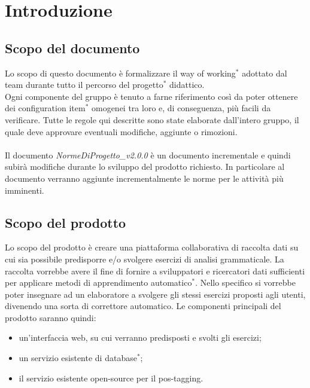 \documentclass[11pt,a4paper]{article}
\begin{document}
{	\newpage	
	
	\renewcommand  \contentsname {\Large Indice} 
	
	\tableofcontents
	\newpage
	\listoffigures
	\lstlistoflistings
	\newpage
	
	\section{Introduzione}
	\subsection{Scopo del documento}
	Lo scopo di questo documento è formalizzare il way of working$^*$ adottato dal team durante tutto il percorso del progetto$^*$ didattico. 
	\\Ogni componente del gruppo è tenuto a farne riferimento così da poter ottenere dei configuration item$^*$ omogenei tra loro e, di conseguenza, più facili da verificare. 
	Tutte le regole qui descritte sono state elaborate dall'intero gruppo, il quale deve approvare eventuali modifiche, aggiunte o rimozioni.
	\\\\
	Il documento \textit{NormeDiProgetto\_v2.0.0} è un documento incrementale e quindi subirà modifiche durante lo sviluppo del prodotto richiesto. In particolare al documento verranno aggiunte incrementalmente le norme per le attività più imminenti.
	\subsection{Scopo del prodotto}
	Lo scopo del prodotto è creare una piattaforma collaborativa di raccolta dati su cui sia possibile predisporre e/o svolgere esercizi di analisi grammaticale. La raccolta vorrebbe avere il fine di fornire a sviluppatori e ricercatori dati sufficienti per applicare metodi di apprendimento automatico$^*$. Nello specifico si vorrebbe poter insegnare ad un elaboratore a svolgere gli stessi esercizi proposti agli utenti, divenendo una sorta di correttore automatico.  
	Le componenti principali del prodotto saranno quindi:
	\begin{itemize}
		\item un'interfaccia web, su cui verranno predisposti e svolti gli esercizi;
		\item un servizio esistente di database$^*$;
		\item il servizio esistente open-source per il pos-tagging.
	\end{itemize}
	
}
\end{document}
